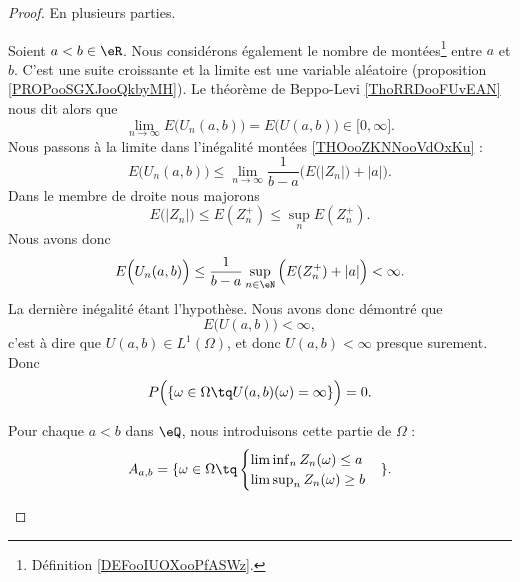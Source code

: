 \begin{proof}

	En plusieurs parties.
	\begin{subproof}
		\spitem[\( U(a,b)\in L^1(\Omega)\)]

		Soient \( a<b\in \eR\). Nous considérons également le nombre de montées\footnote{Définition \ref{DEFooIUOXooPfASWz}.} entre \( a\) et \( b\). C'est une suite croissante et la limite est une variable aléatoire (proposition \ref{PROPooSGXJooQkbyMH}). Le théorème de Beppo-Levi \ref{ThoRRDooFUvEAN} nous dit alors que
		\begin{equation}
			\lim_{n\to \infty}E\big( U_n(a,b) \big) = E\big( U(a,b) \big)\in\mathopen[ 0,\infty\mathclose].
		\end{equation}
		Nous passons à la limite dans l'inégalité montées \ref{THOooZKNNooVdOxKu} :
		\begin{equation}
			E\Big( U_n(a,b) \Big)\leq \lim_{n\to\infty}\frac{1}{ b-a}\Big( E\big( | Z_n | \big)+| a | \Big).
		\end{equation}
		Dans le membre de droite nous majorons
		\begin{equation}
			E\big( | Z_n | \big)\leq E(Z_n^+)\leq \sup_nE(Z_n^+).
		\end{equation}
		Nous avons donc
		\begin{equation}
			E\Big( U_n(a,b) \Big)\leq \frac{1}{ b-a}\sup_{n\in \eN}\Big( E(Z_n^+)+| a | \Big)<\infty.
		\end{equation}
		La dernière inégalité étant l'hypothèse. Nous avons donc démontré que
		\begin{equation}
			E\big( U(a,b) \big)<\infty,
		\end{equation}
		c'est à dire que \( U(a,b)\in L^1(\Omega)\), et donc \( U(a,b)<\infty\) presque surement. Donc
		\begin{equation}		\label{EQooJDDJooNYpzru}
			P\Big( \{ \omega\in \Omega\tq U(a,b)(\omega)=\infty \} \Big)=0.
		\end{equation}

		\spitem[La partie \( A_{a,b}\)]

		Pour chaque \( a<b\) dans \( \eQ\), nous introduisons cette partie de \( \Omega\) :
		\begin{equation}
			A_{a,b}=\{ \omega\in\Omega\tq
			\begin{cases}
				\liminf_nZ_n(\omega)  \leq a \\
				\limsup_nZ_n(\omega)  \geq b
			\end{cases}
			\}.
		\end{equation}


\end{subproof}
\end{proof}
